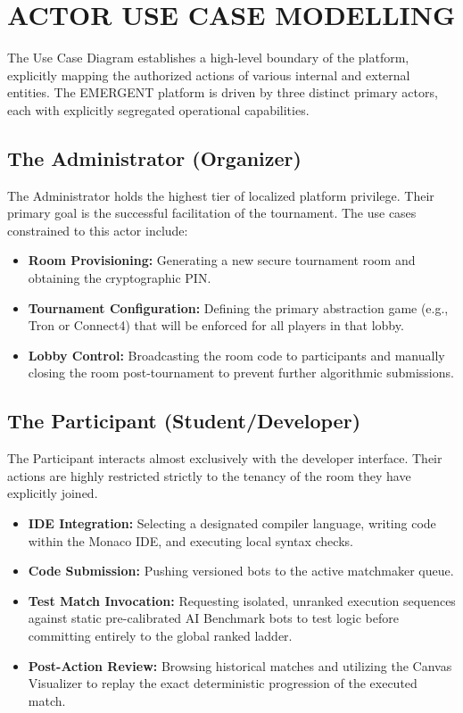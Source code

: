 \documentclass[12pt,a4paper]{report}
\begin{document}
\section{ACTOR USE CASE MODELLING}
The Use Case Diagram establishes a high-level boundary of the platform, explicitly mapping the authorized actions of various internal and external entities. The EMERGENT platform is driven by three distinct primary actors, each with explicitly segregated operational capabilities.

\subsection{The Administrator (Organizer)}
The Administrator holds the highest tier of localized platform privilege. Their primary goal is the successful facilitation of the tournament. The use cases constrained to this actor include:
\begin{itemize}
    \item \textbf{Room Provisioning:} Generating a new secure tournament room and obtaining the cryptographic PIN.
    \item \textbf{Tournament Configuration:} Defining the primary abstraction game (e.g., Tron or Connect4) that will be enforced for all players in that lobby.
    \item \textbf{Lobby Control:} Broadcasting the room code to participants and manually closing the room post-tournament to prevent further algorithmic submissions.
\end{itemize}

\subsection{The Participant (Student/Developer)}
The Participant interacts almost exclusively with the developer interface. Their actions are highly restricted strictly to the tenancy of the room they have explicitly joined.
\begin{itemize}
    \item \textbf{IDE Integration:} Selecting a designated compiler language, writing code within the Monaco IDE, and executing local syntax checks.
    \item \textbf{Code Submission:} Pushing versioned bots to the active matchmaker queue.
    \item \textbf{Test Match Invocation:} Requesting isolated, unranked execution sequences against static pre-calibrated AI Benchmark bots to test logic before committing entirely to the global ranked ladder.
    \item \textbf{Post-Action Review:} Browsing historical matches and utilizing the Canvas Visualizer to replay the exact deterministic progression of the executed match.
\end{itemize}
\end{document}
